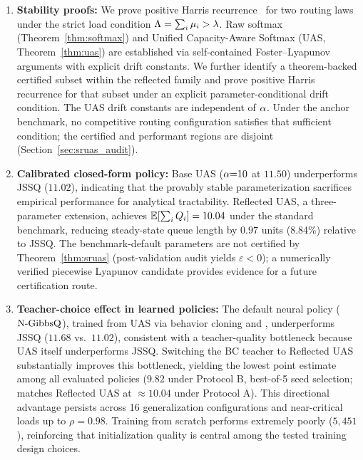 \begin{enumerate}
\item \textbf{Stability proofs:}
We prove positive Harris recurrence~\cite{meyn2009markov} for two routing laws under the strict load condition $\Lambda = \sum_i \mu_i > \lambda$.
Raw softmax (Theorem~\ref{thm:softmax}) and Unified Capacity-Aware Softmax (UAS, Theorem~\ref{thm:uas}) are established via self-contained Foster--Lyapunov arguments with explicit drift constants.
We further identify a theorem-backed certified subset within the reflected family and prove positive Harris recurrence for that subset under an explicit parameter-conditional drift condition.
The UAS drift constants are independent of $\alpha$.
Under the anchor benchmark, no competitive routing configuration satisfies that sufficient condition; the certified and performant regions are disjoint (Section~\ref{sec:sruas_audit}).

\item \textbf{Calibrated closed-form policy:}
Base UAS ($\alpha{=}10$ at $11.50$) underperforms JSSQ ($11.02$), indicating that the provably stable parameterization sacrifices empirical performance for analytical tractability.
Reflected UAS, a three-parameter extension, achieves $\mathbb{E}[\sum_i Q_{i}] = 10.04$ under the standard benchmark, reducing steady-state queue length by $0.97$ units (8.84\%) relative to JSSQ.
The benchmark-default parameters are not certified by Theorem~\ref{thm:sruas} (post-validation audit yields $\varepsilon < 0$); a numerically verified piecewise Lyapunov candidate provides evidence for a future certification route.

\item \textbf{Teacher-choice effect in learned policies:}
The default neural policy ($\text{N-GibbsQ}$), trained from UAS via behavior cloning and \reinforce{}, underperforms JSSQ ($11.68$ vs.\ $11.02$), consistent with a teacher-quality bottleneck because UAS itself underperforms JSSQ.
Switching the BC teacher to Reflected UAS substantially improves this bottleneck, yielding the lowest point estimate among all evaluated policies ($9.82$ under Protocol B, best-of-5 seed selection; matches Reflected UAS at $\approx 10.04$ under Protocol A).
This directional advantage persists across 16 generalization configurations and near-critical loads up to $\rho = 0.98$.
Training from scratch performs extremely poorly ($5{,}451$), reinforcing that initialization quality is central among the tested training design choices.
\end{enumerate}

